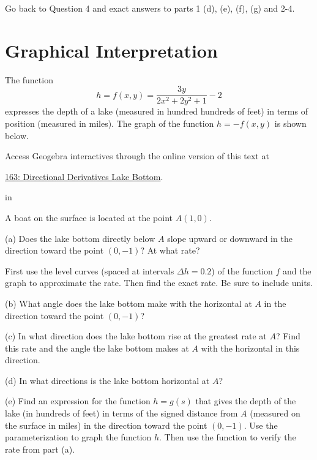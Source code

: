 \documentclass{ximera}
\newcommand{\pskip}{\vskip 0.1 in}
\begin{document}
\begin{question}  \label{Qdef67kk}
Go back to Question 4 and exact answers to parts 1 (d), (e), (f), (g) and 2-4.

\end{question}






\section{Graphical Interpretation}
\begin{exploration} \label{Esdft4ew3}

The function
\[
     h = f(x,y) = \frac{3y}{2x^2+2y^2+1}-2 
\]
expresses the depth of a lake (measured in hundred hundreds of feet) in terms of position (measured in miles). The graph of the function $h= - f(x,y)$ is shown below.

 
\begin{onlineOnly}
    \begin{center}
\end{center}
\end{onlineOnly}

Access Geogebra interactives through the online version of this text at
 
\href{https://www.geogebra.org/classic/md2udchf}{163: Directional Derivatives Lake Bottom}.

\pskip

A boat on the surface is located at the point $A(1,0)$.

(a) Does the lake bottom directly below $A$ slope upward or downward in the direction toward the point $(0,-1)$? At what rate? 

First use the level curves (spaced at intervals $\Delta h = 0.2$) of the function $f$ and the graph to approximate the rate. Then find the exact rate. Be sure to include units.

(b) What angle does the lake bottom make with the horizontal at $A$ in the direction toward the point $(0,-1)$?

(c) In what direction does the lake bottom rise at the greatest rate at $A$? Find this rate and the angle the lake bottom makes at $A$ with the horizontal in this direction.

(d) In what directions is the lake bottom horizontal at $A$?

(e) Find an expression for the function $h=g(s)$ that gives the depth of the lake (in hundreds of feet) in terms of the signed distance from $A$ (measured on the surface in miles) in the direction toward the point $(0,-1)$. Use the parameterization to graph the function $h$. Then use the function to verify the rate from part (a). 

\end{exploration}
\end{document}
